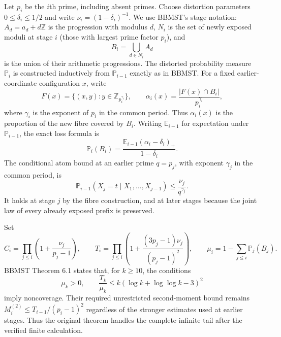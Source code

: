 \documentclass[11pt]{article}
\newcommand{\E}{\mathbb E}
\newcommand{\Pp}{\mathbb P}
\newcommand{\pos}[1]{(#1)_+}
\begin{document}
Let $p_i$ be the $i$th prime, including absent primes. Choose distortion
parameters $0\leq\delta_i\leq1/2$ and write $\nu_i=(1-\delta_i)^{-1}$.
We use BBMST's stage notation: $A_d=a_d+d\mathbb Z$ is the progression
with modulus $d$, $N_i$ is the set of newly exposed moduli at stage $i$
(those with largest prime factor $p_i$), and
\[
 B_i=\bigcup_{d\in N_i}A_d
\]
is the union of their arithmetic progressions. The distorted probability
measure $\Pp_i$ is constructed inductively from $\Pp_{i-1}$ exactly as
in BBMST. For a fixed earlier-coordinate configuration $x$, write
\[
 F(x)=\{(x,y):y\in\mathbb Z_{p_i^{\gamma_i}}\},\qquad
 \alpha_i(x)=\frac{|F(x)\cap B_i|}{p_i^{\gamma_i}},
\]
where $\gamma_i$ is the exponent of $p_i$ in the common period.
Thus $\alpha_i(x)$ is the proportion of the new fibre covered by $B_i$.
Writing $\E_{i-1}$ for expectation under $\Pp_{i-1}$, the exact loss formula is
\begin{equation}\label{eq:loss}
 \Pp_i(B_i)=\frac{\E_{i-1}\pos{\alpha_i-\delta_i}}{1-\delta_i}.
\end{equation}
The conditional atom bound at an earlier prime $q=p_j$, with exponent
$\gamma_j$ in the common period, is
\begin{equation}\label{eq:cap}
 \Pp_{i-1}(X_j=t\mid X_1,\ldots,X_{j-1})
       \leq\frac{\nu_j}{q^{\gamma_j}}.
\end{equation}
It holds at stage $j$ by the fibre construction, and at later stages because
the joint law of every already exposed prefix is preserved.

Set
\[
 C_i=\prod_{j\leq i}\left(1+\frac{\nu_j}{p_j-1}\right),\qquad
 T_i=\prod_{j\leq i}\left(1+
       \frac{(3p_j-1)\nu_j}{(p_j-1)^2}\right),\qquad
 \mu_i=1-\sum_{j\leq i}\Pp_j(B_j).
\]
BBMST Theorem 6.1 states that, for $k\geq10$, the conditions
\begin{equation}\label{eq:stop}
 \mu_k>0,\qquad \frac{T_k}{\mu_k}
 \leq k(\log k+\log\log k-3)^2
\end{equation}
imply noncoverage. Their required unrestricted second-moment bound remains
$M_i^{(2)}\leq T_{i-1}/(p_i-1)^2$ regardless of the stronger estimates used
at earlier stages. Thus the original theorem handles the complete infinite
tail after the verified finite calculation.
\end{document}
